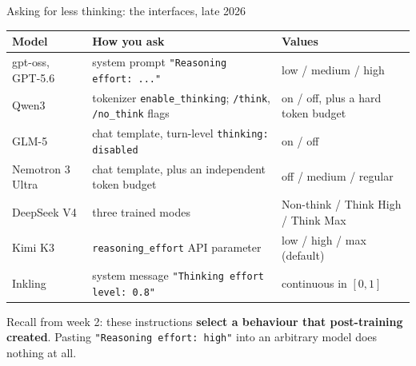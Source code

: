 \documentclass[aspectratio=169,10pt]{beamer}
\begin{document}
\iffalse
\begin{frame}[shrink=4]{Asking for less thinking: the interfaces, late 2026}
  \centering
  \footnotesize
  \begin{tabular}{@{}L{2.5cm} L{4.6cm} L{3.6cm}@{}}
    \toprule
    \textbf{Model} & \textbf{How you ask} & \textbf{Values}\\
    \midrule
    gpt-oss, GPT-5.6 & system prompt \texttt{"Reasoning effort: ..."} & low / medium / high\\
    Qwen3 & tokenizer \texttt{enable\_thinking}; \texttt{/think}, \texttt{/no\_think} flags & on / off, plus a hard token budget\\
    GLM-5 & chat template, turn-level \texttt{thinking: disabled} & on / off\\
    Nemotron 3 Ultra & chat template, plus an independent token budget & off / medium / regular\\
    DeepSeek V4 & three trained modes & Non-think / Think High / Think Max\\
    Kimi K3 & \texttt{reasoning\_effort} API parameter & low / high / max (default)\\
    Inkling & system message \texttt{"Thinking effort level: 0.8"} & continuous in $[0,1]$\\
    \bottomrule
  \end{tabular}

  \vspace{0.7em}
  \raggedright
  \small
  Recall from week 2: these instructions \textbf{select a behaviour that
  post-training created}. Pasting \texttt{"Reasoning effort: high"} into an
  arbitrary model does nothing at all.
\end{frame}
\end{document}
